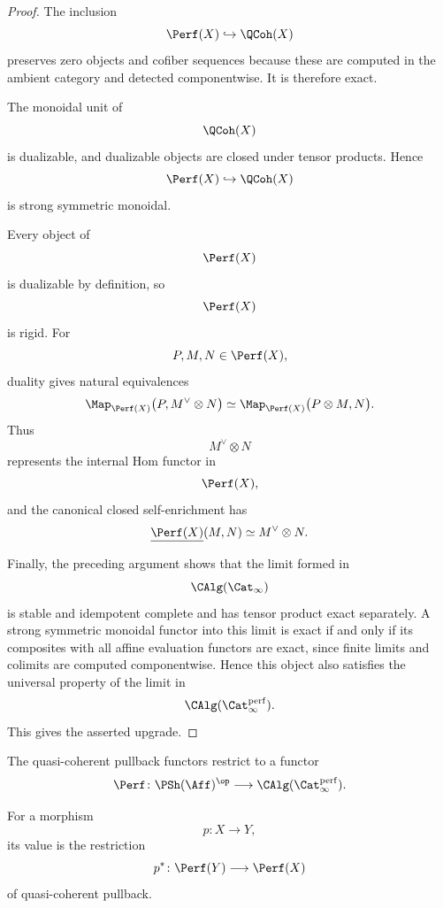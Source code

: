 \begin{proof}
The inclusion
\[
    \Perf(X)
    \hookrightarrow
    \QCoh(X)
\]
preserves zero objects and cofiber sequences because these are computed in
the ambient category and detected componentwise. It is therefore exact.

The monoidal unit of
\[
    \QCoh(X)
\]
is dualizable, and dualizable objects are closed under tensor products.
Hence
\[
    \Perf(X)
    \hookrightarrow
    \QCoh(X)
\]
is strong symmetric monoidal.

Every object of
\[
    \Perf(X)
\]
is dualizable by definition, so
\[
    \Perf(X)
\]
is rigid. For
\[
    P,M,N\in\Perf(X),
\]
duality gives natural equivalences
\[
    \Map_{\Perf(X)}
    \bigl(
        P,
        M^\vee\otimes N
    \bigr)
    \simeq
    \Map_{\Perf(X)}
    \bigl(
        P\otimes M,
        N
    \bigr).
\]
Thus
\[
    M^\vee\otimes N
\]
represents the internal Hom functor in
\[
    \Perf(X),
\]
and the canonical closed self-enrichment has
\[
    \underline{\Perf(X)}(M,N)
    \simeq
    M^\vee\otimes N.
\]

Finally, the preceding argument shows that the limit formed in
\[
    \CAlg(\Cat_\infty)
\]
is stable and idempotent complete and has tensor product exact separately.
A strong symmetric monoidal functor into this limit is exact if and only if
its composites with all affine evaluation functors are exact, since finite
limits and colimits are computed componentwise. Hence this object also
satisfies the universal property of the limit in
\[
    \CAlg(\Cat_\infty^{\mathrm{perf}}).
\]
This gives the asserted upgrade.
\end{proof}

\begin{proposition}
\label{prop:perfect-stack-functoriality}
The quasi-coherent pullback functors restrict to a functor
\[
    \Perf
    \colon
    \PSh(\Aff)^{\op}
    \longrightarrow
    \CAlg(\Cat_\infty^{\mathrm{perf}}).
\]

For a morphism
\[
    p
    \colon
    X
    \longrightarrow
    Y,
\]
its value is the restriction
\[
    p^*
    \colon
    \Perf(Y)
    \longrightarrow
    \Perf(X)
\]
of quasi-coherent pullback.
\end{proposition}

